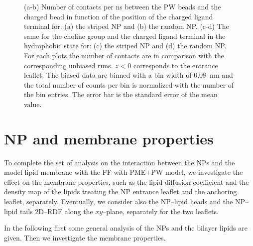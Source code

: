 \begin{figure}[ht!]
{		}
		\caption{(a-b) Number of contacts per ns between the \acs{PW} beads and the charged bead in function of the position of the charged ligand terminal for: (a) the striped \acs{NP} and (b) the random \acs{NP}. (c-d) The same for the choline group and the charged ligand terminal in the hydrophobic state for: (c) the striped \ac{NP} and (d) the random \acs{NP}. For each plots the number of contacts are in comparison with the corresponding unbiased runs. $z<0$ corresponds to the entrance leaflet. The biased data are binned with a bin width of $0.08$~nm and the total number of counts per bin is normalized with the number of the bin entries. The error bar is the standard error of the mean value.}%
		\label{fig:contactsUn}
\end{figure}

\clearpage
\section{NP and membrane properties}
To complete the set of analysis on the interaction between the \acp{NP} and the model lipid membrane with the \martini \ac{FF} with \ac{PME}$+$\ac{PW} model, we investigate the effect on the membrane properties, such as the lipid diffusion coefficient and the density map of the lipids treating the \ac{NP} entrance leaflet and the anchoring leaflet, separately. Eventually, we consider also the \ac{NP}--lipid heads and the \ac{NP}--lipid tails $2$D--\ac{RDF} along the $xy$--plane, separately for the two leaflets.

In the following first some general analysis of the \acp{NP} and the bilayer lipids are given. Then we investigate the membrane properties.

